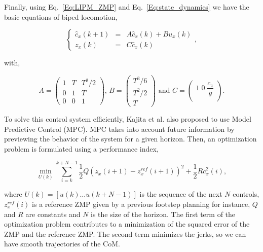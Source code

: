 Finally, using Eq.~\ref{Eq:LIPM_ZMP} and Eq.~\ref{Eq:state_dynamics} we have the basic equations of biped locomotion,

\begin{equation}
\label{Eq:basic_dynamic_equations}
\left\{
\begin{array}{ccc}
 \hat{c}_x(k+1) &=&  A \hat{c}_x(k) + B u_x(k)\\
 z_x(k) &=& C \hat{c}_x(k)
\end{array}
\right.,
\end{equation}

\noindent with,

\begin{equation*}
 A = \left(
\begin{matrix}
1 & T & T^2/2 \\
0 & 1 & T \\
0 & 0 & 1
\end{matrix}
\right) \text{, }
{ B} = \left(
\begin{matrix}
T^3/6 \\
T^2/2 \\
T
\end{matrix}
\right) \text{ and }
{ C} = \left(
\begin{matrix}
1 \; 0 \; \dfrac{c_z}{g} \\
\end{matrix}
\right).
\end{equation*}

To solve this control system efficiently, Kajita et al. also  proposed to use Model Predictive Control (MPC). MPC takes into account future information by previewing the behavior of the system for a given horizon. Then, an optimization problem is formulated using a performance index,

\begin{equation}
\label{Eq:Performance-Index}
\min_{U(k)} \sum\limits_{i=k}^{k+N - 1} \frac{1}{2} Q (z_x(i+1) - z_x^{ref}(i+1))^2 + \frac{1}{2}R\dddot{c}_x^2(i),
\end{equation}

\noindent where $U(k) = [u(k)\hdots u(k+N-1)]$ is the sequence of the next $N$ controls, $z_x^{ref}(i)$ is a reference ZMP given by a previous footstep planning for instance, $Q$ and $R$ are constants and $N$ is the size of the horizon. The first term of the optimization problem contributes to a minimization of the squared error of the ZMP and the reference ZMP. The second term minimizes the jerks, so we can have smooth trajectories of the CoM.

